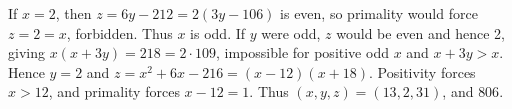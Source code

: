 If $x=2$, then $z=6y-212=2(3y-106)$ is even, so primality would force $z=2=x$, forbidden. Thus $x$ is odd. If $y$ were odd, $z$ would be even and hence 2, giving $x(x+3y)=218=2\cdot109$, impossible for positive odd $x$ and $x+3y>x$. Hence $y=2$ and $z=x^2+6x-216=(x-12)(x+18)$. Positivity forces $x>12$, and primality forces $x-12=1$. Thus $(x,y,z)=(13,2,31)$, and $\boxed{806}$.
